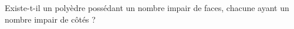 Existe-t-il un polyèdre possédant un nombre impair de faces, chacune ayant un nombre impair de côtés ?
